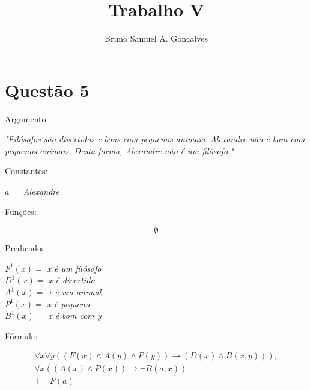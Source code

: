 \documentclass[12pt]{article}
\title{Trabalho V}
\author{Bruno Samuel A. Gonçalves}
\date{}
\begin{document}
\maketitle
\thispagestyle{empty}

\section{Questão 5}

\noindent Argumento:

\begin{center}
    \textit{"Filósofos são divertidos e bons com pequenos animais. Alexandre não é bom com pequenos animais. Desta forma, Alexandre não é um filósofo."}
\end{center}

\noindent Constantes:

\begin{center}
    $a =$ \textit{Alexandre}
\end{center}

\noindent Funções:

\[
    \emptyset
\]

\noindent Predicados:

\begin{center}
    $F^1(x) =$ \textit{x é um filósofo} \\
    $D^1(x) =$ \textit{x é divertido} \\
    $A^1(x) =$ \textit{x é um animal} \\
    $P^1(x) =$ \textit{x é pequeno} \\
    $B^1(x) =$ \textit{x é bom com y}
\end{center}

\noindent Fórmula:

\begin{gather*}
    \forall x \forall y ((F(x) \land A(y) \land P(y)) \to (D(x) \land B(x, y))), \\
    \forall x ((A(x) \land P(x)) \to \neg B(a, x)) \\
    \vdash \neg F(a)
\end{gather*}
\end{document}
